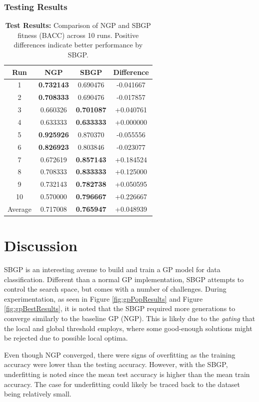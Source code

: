 \documentclass{article}
\begin{document}
\subsubsection{Testing Results}
\begin{table}[H]
\centering
\begin{tabular}{cccc}
\toprule
\textbf{Run} & \textbf{NGP} & \textbf{SBGP} & \textbf{Difference} \\
\midrule
1 & \textbf{0.732143} & 0.690476 & -0.041667 \\
2 & \textbf{0.708333} & 0.690476 & -0.017857 \\
3 & 0.660326 & \textbf{0.701087} & +0.040761 \\
4 & 0.633333 & \textbf{0.633333} & +0.000000 \\
5 & \textbf{0.925926} & 0.870370 & -0.055556 \\
6 & \textbf{0.826923} & 0.803846 & -0.023077 \\
7 & 0.672619 & \textbf{0.857143} & +0.184524 \\
8 & 0.708333 & \textbf{0.833333} & +0.125000 \\
9 & 0.732143 & \textbf{0.782738} & +0.050595 \\
10 & 0.570000 & \textbf{0.796667} & +0.226667 \\
\midrule
Average & 0.717008 & \textbf{0.765947} & +0.048939 \\
\bottomrule
\end{tabular}
\caption{\textbf{Test Results:} Comparison of NGP and SBGP fitness (BACC) across 10 runs. Positive differences indicate better performance by SBGP.}
\label{tab:bacc_comparison}
\end{table}

\section{Discussion}
\label{discussion}
SBGP is an interesting avenue to build and train a GP model for data classification. Different than a normal GP implementation, SBGP attempts to control the search space, but comes with a number of challenges. During experimentation, as seen in Figure \ref{fig:gpPopResults} and Figure \ref{fig:gpBestResults}, it is noted that the SBGP required more generations to converge similarly to the baseline GP (NGP). This is likely due to the \emph{gating} that the local and global threshold employs, where some good-enough solutions might be rejected due to possible local optima.

Even though NGP converged, there were signs of overfitting as the training accuracy were lower than the testing accuracy. However, with the SBGP, underfitting is noted since the mean test accuracy is higher than the mean train accuracy. The case for underfitting could likely be traced back to the dataset being relatively small.
\end{document}
